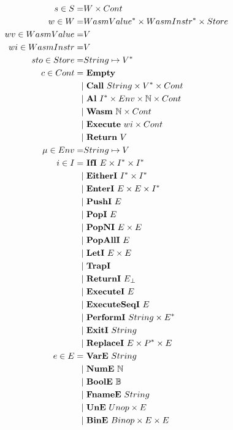\begin{align*}
%
  s \in S =& W \times Cont \\
%
  w \in W =& \seq{WasmValue} \times \seq{WasmInstr} \times Store \\
  wv \in WasmValue =& V \\
  wi \in WasmInstr =& V \\
%
  sto \in Store =& String \mapsto \seq V \\
%
  c \in Cont =& ~ \mt \\
    | & ~ \call ~ String \times \seq V \times Cont \\
    | & ~ \al ~ \seq I \times Env \times \mathbb N \times Cont \\
    | & ~ \wasm ~ \mathbb N \times Cont \\
    | & ~ \exe ~ wi \times Cont \\
    | & ~ \ret ~ V \\
%
  \mu \in Env =& String \mapsto V \\
%
  i \in I =& ~ \ifi ~ E \times \seq I \times \seq I \\
    | & ~ \eitheri ~ \seq I \times \seq I \\
    | & ~ \enteri ~ E \times E \times \seq I \\
    | & ~ \pushi ~ E \\
    | & ~ \popi ~ E \\
    | & ~ \popni ~ E \times E \\
    | & ~ \popalli ~ E \\
    | & ~ \leti ~ E \times E \\
    | & ~ \trapi \\
    | & ~ \returni ~ E_{\bot} \\
    | & ~ \executei ~ E \\
    | & ~ \executeseqi ~ E \\
    | & ~ \performi ~ String \times \seq{E} \\
    | & ~ \exiti ~ String \\
    | & ~ \replacei ~ E \times \seq P \times E \\
%
  e \in E =& ~ \vare ~ String \\
    | & ~ \nume ~ \mathbb N \\
    | & ~ \boole ~ \mathbb B \\
    | & ~ \fnamee ~ String \\
    | & ~ \une ~ Unop \times E \\
    | & ~ \bine ~ Binop \times E \times E \\

\end{align*}
